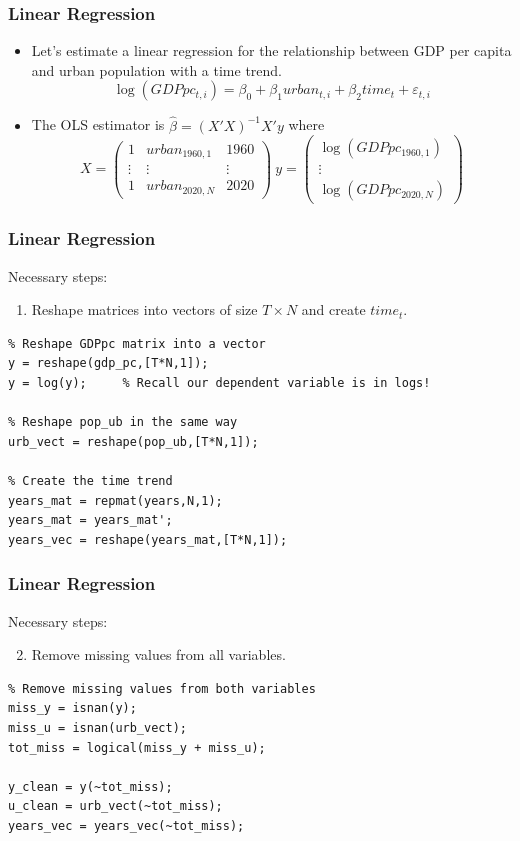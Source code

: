 \documentclass[11pt,xcolor={svgnames},aspectratio=169,usepdftitle=false,notheorems]{beamer}
\begin{document}
\begin{frame}[fragile]
  \frametitle{Linear Regression}
\begin{itemize}
  \item Let's estimate a linear regression for the relationship between GDP per capita and urban population with a time trend.
  \[
  \log(GDPpc_{t,i}) = \beta_0 + \beta_1 urban_{t,i} + \beta_2 time_t + \varepsilon_{t,i}
  \]
  \item The OLS estimator is $\hat{\beta} = (X'X)^{-1}X'y$ where
  \[
  X = \begin{pmatrix}
    1 & urban_{1960,1} & 1960 \\
    \vdots & \vdots & \vdots \\
    1 & urban_{2020,N} & 2020 
  \end{pmatrix}  \ 
  y = \begin{pmatrix}
    \log(GDPpc_{1960,1}) \\
    \vdots \\
    \log(GDPpc_{2020,N})
  \end{pmatrix}
  \]
\end{itemize}
\end{frame}

\begin{frame}[fragile]
  \frametitle{Linear Regression}
Necessary steps:
\begin{enumerate}
  \item Reshape matrices into vectors of size $T\times N$ and create $time_t$.
\end{enumerate}
\begin{lstlisting}
% Reshape GDPpc matrix into a vector
y = reshape(gdp_pc,[T*N,1]);
y = log(y);     % Recall our dependent variable is in logs!

% Reshape pop_ub in the same way
urb_vect = reshape(pop_ub,[T*N,1]);

% Create the time trend
years_mat = repmat(years,N,1);
years_mat = years_mat';
years_vec = reshape(years_mat,[T*N,1]);
\end{lstlisting}
\end{frame}

\begin{frame}[fragile]
  \frametitle{Linear Regression}
Necessary steps:
\begin{enumerate}
  \setcounter{enumi}{1}
  \item Remove missing values from all variables.
\end{enumerate}
\begin{lstlisting}
% Remove missing values from both variables
miss_y = isnan(y);
miss_u = isnan(urb_vect);
tot_miss = logical(miss_y + miss_u);

y_clean = y(~tot_miss);
u_clean = urb_vect(~tot_miss);
years_vec = years_vec(~tot_miss);
\end{lstlisting}
\end{frame}
\end{document}
